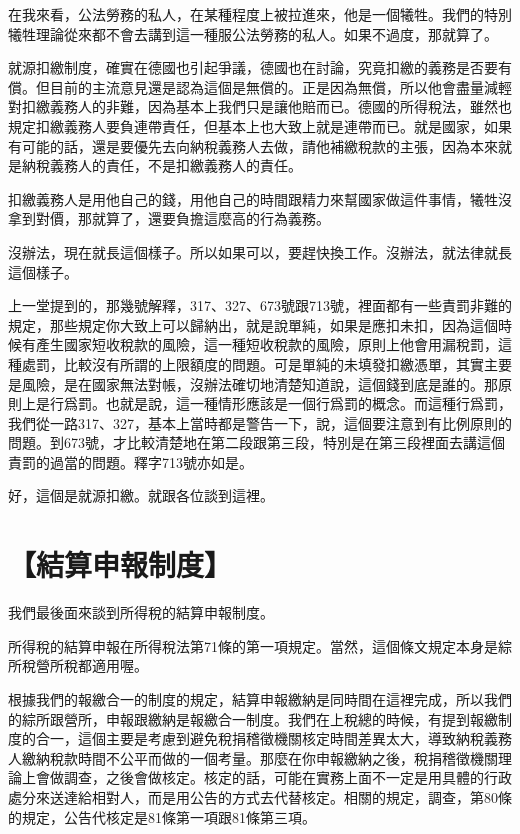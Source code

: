 \documentclass[]{ctexbook}
\begin{document}
在我來看，公法勞務的私人，在某種程度上被拉進來，他是一個犧牲。我們的特別犧牲理論從來都不會去講到這一種服公法勞務的私人。如果不過度，那就算了。

就源扣繳制度，確實在德國也引起爭議，德國也在討論，究竟扣繳的義務是否要有償。但目前的主流意見還是認為這個是無償的。正是因為無償，所以他會盡量減輕對扣繳義務人的非難，因為基本上我們只是讓他賠而已。德國的所得稅法，雖然也規定扣繳義務人要負連帶責任，但基本上也大致上就是連帶而已。就是國家，如果有可能的話，還是要優先去向納稅義務人去做，請他補繳稅款的主張，因為本來就是納稅義務人的責任，不是扣繳義務人的責任。

扣繳義務人是用他自己的錢，用他自己的時間跟精力來幫國家做這件事情，犧牲沒拿到對價，那就算了，還要負擔這麼高的行為義務。

沒辦法，現在就長這個樣子。所以如果可以，要趕快換工作。沒辦法，就法律就長這個樣子。

上一堂提到的，那幾號解釋，317、327、673號跟713號，裡面都有一些責罰非難的規定，那些規定你大致上可以歸納出，就是說單純，如果是應扣未扣，因為這個時候有產生國家短收稅款的風險，這一種短收稅款的風險，原則上他會用漏稅罰，這種處罰，比較沒有所謂的上限額度的問題。可是單純的未填發扣繳憑單，其實主要是風險，是在國家無法對帳，沒辦法確切地清楚知道說，這個錢到底是誰的。那原則上是行爲罰。也就是說，這一種情形應該是一個行爲罰的概念。而這種行爲罰，我們從一路317、327，基本上當時都是警告一下，說，這個要注意到有比例原則的問題。到673號，才比較清楚地在第二段跟第三段，特別是在第三段裡面去講這個責罰的過當的問題。釋字713號亦如是。

好，這個是就源扣繳。就跟各位談到這裡。

\hypertarget{ux7d50ux7b97ux7533ux5831ux5236ux5ea6}{%
\section{【結算申報制度】}\label{ux7d50ux7b97ux7533ux5831ux5236ux5ea6}}

我們最後面來談到所得稅的結算申報制度。

所得稅的結算申報在所得稅法第71條的第一項規定。當然，這個條文規定本身是綜所稅營所稅都適用喔。

根據我們的報繳合一的制度的規定，結算申報繳納是同時間在這裡完成，所以我們的綜所跟營所，申報跟繳納是報繳合一制度。我們在上稅總的時候，有提到報繳制度的合一，這個主要是考慮到避免稅捐稽徵機關核定時間差異太大，導致納稅義務人繳納稅款時間不公平而做的一個考量。那麼在你申報繳納之後，稅捐稽徵機關理論上會做調查，之後會做核定。核定的話，可能在實務上面不一定是用具體的行政處分來送達給相對人，而是用公告的方式去代替核定。相關的規定，調查，第80條的規定，公告代核定是81條第一項跟81條第三項。
\end{document}
